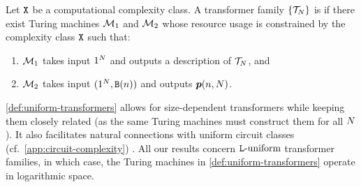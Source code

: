 \begin{definition} \label{def:uniform-transformers}
   Let ${\mathtt{X}}$ be a computational complexity class.
   A transformer family $\{{{\mathcal{T}}}_{{N}}\}$ is  if there exist Turing machines ${{\mathcal{M}}}_1$ and ${{\mathcal{M}}}_2$ whose resource usage is constrained by the complexity class ${\mathtt{X}}$ such that: 
   \begin{enumerate}[label=(\arabic*),topsep=0pt,noitemsep]
      \item ${{\mathcal{M}}}_1$ takes input $1^{{N}}$ and outputs a description of ${{\mathcal{T}}}_{{N}}$, and
      \item ${{\mathcal{M}}}_2$ takes input $(1^{{N}}, {\texttt{B}}({{n}}))$ and outputs ${\bm{p}}({{n}}, {{N}})$.
   \end{enumerate} 
\end{definition}

\cref{def:uniform-transformers} allows for size-dependent transformers while keeping them closely related (as the same Turing machines must construct them for all ${{N}}$). 
It also facilitates natural connections with uniform circuit classes (cf.~\cref{app:circuit-complexity}) \citep{london2025pausetokensstrictlyincrease}.
All our results concern ${{\mathtt{L}}\textnormal{-uniform}}$ transformer families, in which case, the Turing machines in \cref{def:uniform-transformers} operate in logarithmic space.

